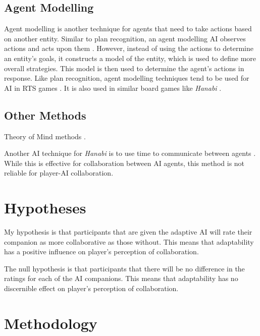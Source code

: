 \documentclass{IEEEtran}
\begin{document}
\subsection{Agent Modelling}
\label{AgentModelling}

Agent modelling is another technique for agents that need to take actions based on another entity. Similar to plan recognition, an agent modelling AI observes actions and acts upon them \cite{yannakakis2013playermodelling}. However, instead of using the actions to determine an entity’s goals, it constructs a model of the entity, which is used to define more overall strategies. This model is then used to determine the agent's actions in response. Like plan recognition, agent modelling techniques tend to be used for AI in RTS games \cite{OpponentModellingRTS2007, bakkes2009opponentmodelling}. It is also used in similar board games like \textit{Hanabi} \cite{EvaluatingHanabiAgents}.

\subsection{Other Methods}
\label{OtherConsiderations}

Theory of Mind methods \cite{TheoryOfMind2013, von2017mindsofmany}.

Another AI technique for \textit{Hanabi} is to use time to communicate between agents \cite{WaitASecond2019}. While this is effective for collaboration between AI agents, this method is not reliable for player-AI collaboration.

\section{Hypotheses}
\label{Hypotheses}

My hypothesis is that participants that are given the adaptive AI will rate their companion as more collaborative as those without. This means that adaptability has a positive influence on player’s perception of collaboration.

The null hypothesis is that participants that there will be no difference in the ratings for each of the AI companions. This means that adaptability has no discernible effect on player’s perception of collaboration.

\section{Methodology}
\label{Method}
\end{document}
